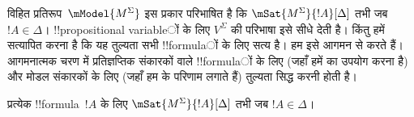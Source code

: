 \documentclass[../../../include/open-logic-section]{subfiles}
\begin{document}


विहित प्रतिरूप~$\mModel{M^\Sigma}$ इस प्रकार परिभाषित है कि
$\mSat{M^\Sigma}{!A}[\Delta]$ तभी जब $!A \in \Delta$। !!{propositional variable}ों के लिए $V^\Sigma$ की परिभाषा इसे सीधे देती है। किंतु हमें सत्यापित
करना है कि यह तुल्यता सभी !!{formula}ों के लिए सत्य है। हम इसे आगमन से करते
हैं। आगमनात्मक चरण में प्रतिज्ञप्तिक संकारकों वाले !!{formula}ों के लिए
(जहाँ हमें  का उपयोग करना है) और मोडल
संकारकों के लिए (जहाँ हम  के परिणाम लगाते हैं) तुल्यता
सिद्ध करनी होती है।

\begin{prop}[सत्यता लेम्मा]
  प्रत्येक !!{formula}~$!A$ के लिए $\mSat{M^\Sigma}{!A}[\Delta]$ तभी जब
  $!A \in \Delta$।
\end{prop}
\end{document}
